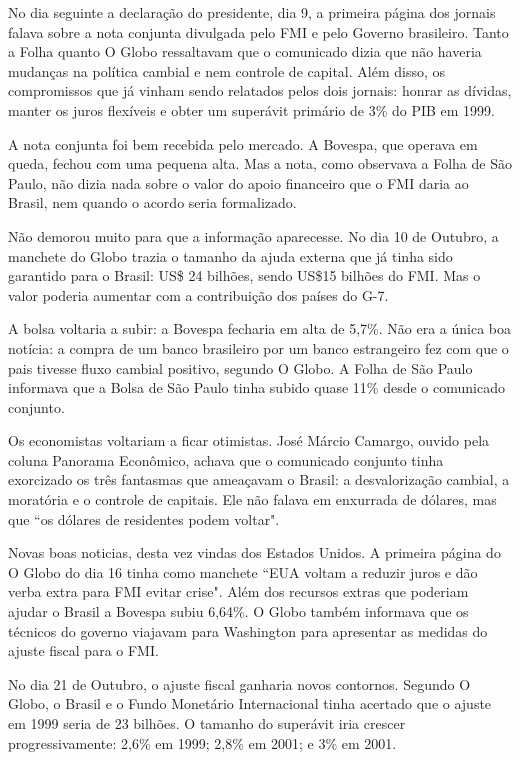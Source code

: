 \documentclass{article}
\begin{document}
 No dia seguinte a declaração do presidente, dia 9, a primeira página dos jornais falava sobre a nota conjunta divulgada pelo FMI e pelo Governo brasileiro. Tanto a Folha quanto O Globo ressaltavam que o comunicado dizia que não haveria mudanças na política cambial e nem controle de capital. Além disso, os compromissos que já vinham sendo relatados pelos dois jornais: honrar as dívidas, manter os juros flexíveis e obter um superávit primário de 3\% do PIB em 1999.

A nota conjunta foi bem recebida pelo mercado. A Bovespa, que operava em queda, fechou com uma pequena alta. Mas a nota, como observava a Folha de São Paulo, não dizia nada sobre o valor do apoio financeiro que o FMI daria ao Brasil, nem quando o acordo seria formalizado.

Não demorou muito para que a informação aparecesse. No dia 10 de Outubro, a manchete do Globo trazia o tamanho da ajuda externa que já tinha sido garantido para o Brasil: US\$ 24 bilhões, sendo US\$15 bilhões do FMI. Mas o valor poderia aumentar com a contribuição dos países do G-7. 

A bolsa voltaria a subir: a Bovespa fecharia em alta de 5,7\%. Não era a única boa notícia: a compra de um banco brasileiro por um banco estrangeiro fez com que o pais tivesse fluxo cambial positivo, segundo O Globo. A Folha de São Paulo informava que a Bolsa de São Paulo tinha subido quase 11\% desde o comunicado conjunto. 

Os economistas voltariam a ficar otimistas. José Márcio Camargo, ouvido pela coluna Panorama Econômico, achava que o comunicado conjunto tinha exorcizado os três fantasmas que ameaçavam o Brasil: a desvalorização cambial, a moratória e o controle de capitais. Ele não falava em enxurrada de dólares, mas que ``os dólares de residentes podem voltar".        
 
Novas boas noticias, desta vez vindas dos Estados Unidos. A primeira página do O Globo do dia 16 tinha como manchete ``EUA voltam a reduzir juros e dão verba extra para FMI evitar crise". Além dos recursos extras que poderiam ajudar o Brasil a Bovespa subiu 6,64\%. O Globo também informava que os técnicos do governo viajavam para Washington para apresentar as medidas do ajuste fiscal para o FMI. 

No dia 21 de Outubro, o ajuste fiscal ganharia novos contornos. Segundo O Globo, o Brasil e o Fundo Monetário Internacional tinha acertado que o ajuste em 1999 seria de 23 bilhões. O tamanho do superávit iria crescer progressivamente: 2,6\% em 1999; 2,8\% em 2001; e 3\% em 2001.         
 
\end{document}
